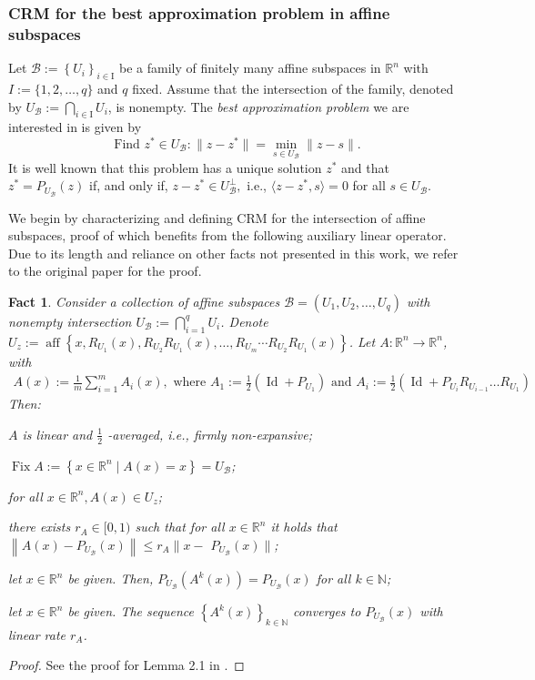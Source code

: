 \documentclass[smallextended,numbook,nospthms]{svjour3}
\theoremstyle{plain}
\newtheorem{fact}[theorem]{Fact}
\theoremstyle{definition}
\def\RR{\mathds R}
\def\NN{\mathds N}
\DeclareMathOperator{\Id}{Id}
\DeclareMathOperator{\Fix}{Fix}
\begin{document}
\subsubsection{CRM for the best approximation problem in affine subspaces}
Let $\mathcal{B}:=\left\{U_{i}\right\}_{i \in \mathrm{I}}$ be a family of finitely many affine subspaces in $\RR^{n}$ with $I:=\{1,2, \ldots, q\}$ and $q$ fixed. Assume that the intersection of the family, denoted by $U_{\mathcal{B}}:=\bigcap_{i \in \mathrm{I}} U_{i}$, is nonempty. The \emph{best approximation problem} we are interested in is given by
$$
\text{Find }z^* \in U_{\mathcal{B}}: \|z-z^*\| = \min _{s \in U_{\mathcal{B}}}\|z-s\|.
$$
It is well known that this problem has a unique solution $z^*$ and that $z^*=P_{U_{\mathcal{B}}}(z)$ if, and only if, $z-z^* \in U_{\mathcal{B}}^{\perp},$ i.e., $\langle z-z^*, s\rangle=0$ for all $s \in U_{\mathcal{B}}$.

We begin by characterizing and defining CRM for the intersection of affine subspaces, proof of which benefits from the following auxiliary linear operator. Due to its length and reliance on other facts not presented in this work, we refer to the original paper for the proof.
\begin{fact}\label{fact:CRM aux op}
	Consider a collection of affine subspaces $\mathcal{B}=\left(U_{1}, U_{2}, \ldots, U_{q}\right)$ with nonempty intersection $U_{\mathcal{B}}:=\bigcap_{i=1}^{q} U_{i}$. Denote $U_{z}:= \operatorname{aff}\left\{x, R_{U_{1}}(x), R_{U_{2}} R_{U_{1}}(x), \ldots, R_{U_{m}} \cdots R_{U_{2}} R_{U_{1}}(x)\right\}$. Let $A: \RR^{n} \rightarrow \RR^{n}$, with
	\begin{align}
		A(x):=\frac{1}{m} \sum_{i=1}^{m} A_{i}(x), \text { where } 
		A_{1}:=\frac{1}{2}\left(\Id+P_{U_{1}}\right) \text { and }  A_{i}:=\frac{1}{2}\left(\Id+P_{U_{i}} R_{U_{i-1}} \ldots R_{U_{1}}\right)
	\end{align}
	Then:
	\begin{listi}
		\item $A$ is linear and $\frac{1}{2}$ -averaged, i.e., firmly non-expansive;
		\item $\Fix A:=\left\{x \in \RR^{n} \mid A(x)=x\right\}=U_{\mathcal{B}}$;
		\item for all $x \in \RR^{n}, A(x) \in U_{z}$;
		\item there exists $r_{A} \in[0,1)$ such that for all $x \in \RR^{n}$ it holds that $\left\|A(x)-P_{U_{\mathcal{B}}}(x)\right\| \leq r_{A} \| x-$ $P_{U_{\mathcal{B}}}(x)\|$;
		\item let $x \in \RR^{n}$ be given. Then, $P_{U_{\mathcal{B}}}\left(A^{k}(x)\right)=P_{U_{\mathcal{B}}}(x)$ for all $k \in \NN$;
		\item let $x \in \RR^{n}$ be given. The sequence $\left\{A^{k}(x)\right\}_{k \in \NN}$ converges to $P_{U_{\mathcal{B}}}(x)$ with linear rate $r_{A}$.
	\end{listi}
\end{fact}
\begin{proof}
	See the proof for Lemma 2.1 in \cite{Behling:2018a}.
\end{proof}
\end{document}
